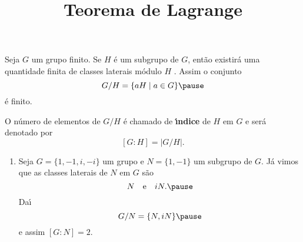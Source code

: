 \documentclass{beamer}
\title{Teorema de Lagrange}
\author[\autor]{\autor}
\institute[\instituto]{\instituto}
\date{}
\begin{document}
    \begin{frame}
        \maketitle
    \end{frame}


    \begin{frame}
        Seja $G$ um grupo finito. \pause Se $H$ \'e um subgrupo de $G$, \pause ent\~ao existir\'a uma quantidade finita de classes laterais m\'odulo $H$ \pause.
        Assim o conjunto
        \[
            G/H = \{aH \mid a \in G\} \pause
        \]
        \'e finito. \pause

        O n\'umero de elementos de $G/H$ \pause \'e chamado de \textbf{{\'\i}ndice} \pause de $H$ em $G$ \pause e ser\'a denotado por
        \[
            [G : H] = |G/H|.
        \]
    \end{frame}

    \begin{frame}
        \begin{exemplos}
            \begin{enumerate}[label=({\arabic*})]
                \item Seja $G = \{1, -1, i, -i\}$ um grupo \pause e $N = \{1, -1\}$ \pause um subgrupo de $G$. \pause J\'a vimos que as classes laterais de $N$ em $G$ s\~ao \pause
                \[
                    N \quad \mbox{e}\quad iN. \pause
                \]
                Da{\'\i}
                \[
                    G/N = \{N, iN\} \pause
                \]
                e assim $[G : N] = 2$.

                \seti
            \end{enumerate}
        \end{exemplos}
    \end{frame}
\end{document}
